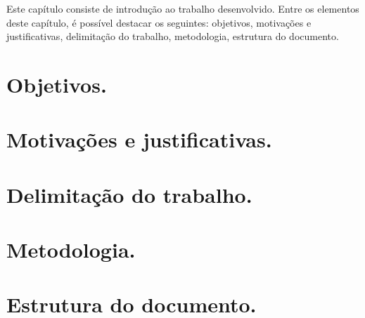 Este capítulo consiste de introdução ao trabalho desenvolvido. Entre os elementos deste capítulo, é possível destacar os seguintes: objetivos, motivações e justificativas, delimitação do trabalho, metodologia, estrutura do documento.

\section{Objetivos.}
\section{Motivações e justificativas.}
\section{Delimitação do trabalho.}
\section{Metodologia.}
\section{Estrutura do documento.}